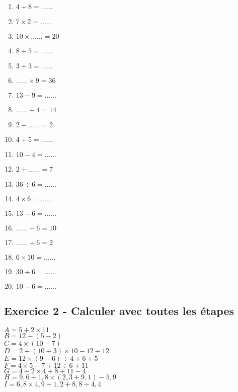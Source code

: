 \begin{multicols}{4}\noindent
  \begin{enumerate}
    \item $4 + 8 = \ldots\ldots$
    \item $7 \times 2 = \ldots\ldots$
    \item $10 \times \ldots\ldots = 20$
    \item $8 + 5 = \ldots\ldots$
    \item $3 \div 3 = \ldots\ldots$
    \item $\ldots\ldots \times 9 = 36$
    \item $13 - 9 = \ldots\ldots$
    \item $\ldots\ldots + 4 = 14$
    \item $2 \div \ldots\ldots = 2$
    \item $4 + 5 = \ldots\ldots$
    \item $10 - 4 = \ldots\ldots$
    \item $2 + \ldots\ldots = 7$
    \item $36 \div 6 = \ldots\ldots$
    \item $4 \times 6 = \ldots\ldots$
    \item $13 - 6 = \ldots\ldots$
    \item $\ldots\ldots - 6 = 10$
    \item $\ldots\ldots \div 6 = 2$
    \item $6 \times 10 = \ldots\ldots$
    \item $30 \div 6 = \ldots\ldots$ 
    \item $10 - 6 = \ldots\ldots$
  \end{enumerate}
 \end{multicols}

\subsection*{Exercice 2 - Calculer avec toutes les étapes}

\begin{multicols}{3}
  \noindent
  $A = 5+2\times 11 $\\
  $B = 12-(5-2) $\\
  $C = 4 \times (10-7) $\\
  $D = 2+(10+3)\times 10-12\div 12 $\\
  $E = 12 \times (9-6) \div 4+6+5 $\\
  $F = 4\times 5-7+12\div 6+11 $\\
  $G = 4\div 2\times 4+8+11-4 $\\
  $H = 9{,}6+1{,}8\times (2{,}3+9{,}1)-5{,}9 $\\
  $I= 6{,}8\times 4{,}9+1{,}2+8{,}8\div 4{,}4$
\end{multicols}

